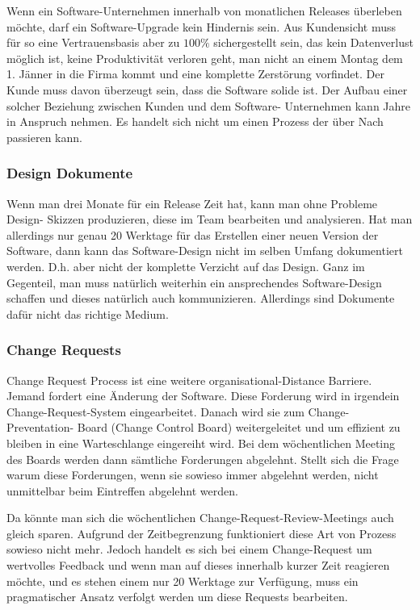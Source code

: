 Wenn ein Software-Unternehmen innerhalb von monatlichen Releases überleben
möchte, darf ein Software-Upgrade kein Hindernis sein. Aus Kundensicht muss
für so eine Vertrauensbasis aber zu $100\%$ sichergestellt sein, das kein
Datenverlust möglich ist, keine Produktivität verloren geht, man nicht an
einem Montag dem 1. Jänner in die Firma kommt und eine komplette Zerstörung
vorfindet. Der Kunde muss davon überzeugt sein, dass die Software solide ist.
Der Aufbau einer solcher Beziehung zwischen Kunden und dem Software-
Unternehmen kann Jahre in Anspruch nehmen. Es handelt sich nicht um einen
Prozess der über Nach passieren kann.

\subsubsection{Design Dokumente}
Wenn man drei Monate für ein Release Zeit hat, kann man ohne Probleme Design-
Skizzen produzieren, diese im Team bearbeiten und analysieren. Hat man
allerdings nur genau 20 Werktage für das Erstellen einer neuen Version der
Software, dann kann das Software-Design nicht im selben Umfang dokumentiert
werden. D.h. aber nicht der komplette Verzicht auf das Design. Ganz im
Gegenteil, man muss natürlich weiterhin ein ansprechendes Software-Design
schaffen und dieses natürlich auch kommunizieren. Allerdings sind Dokumente
dafür nicht das richtige Medium.

\subsubsection{Change Requests}
Change Request Process ist eine weitere organisational-Distance Barriere.
Jemand fordert eine Änderung der Software. Diese Forderung wird in irgendein
Change-Request-System eingearbeitet. Danach wird sie zum Change-Preventation-
Board (Change Control Board) weitergeleitet und um effizient zu bleiben in
eine Warteschlange eingereiht wird. Bei dem wöchentlichen Meeting des Boards
werden dann sämtliche Forderungen abgelehnt. Stellt sich die Frage warum diese
Forderungen, wenn sie sowieso immer abgelehnt werden, nicht unmittelbar beim
Eintreffen abgelehnt werden.

Da könnte man sich die wöchentlichen Change-Request-Review-Meetings auch
gleich sparen. Aufgrund der Zeitbegrenzung funktioniert diese Art von Prozess
sowieso nicht mehr. Jedoch handelt es sich bei einem Change-Request um
wertvolles Feedback und wenn man auf dieses innerhalb kurzer Zeit reagieren
möchte, und es stehen einem nur 20 Werktage zur Verfügung, muss ein
pragmatischer Ansatz verfolgt werden um diese Requests bearbeiten.

